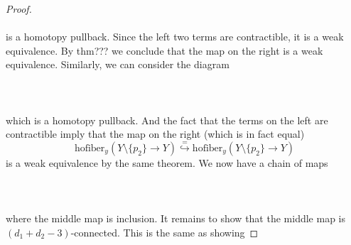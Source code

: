 \documentclass[a4paper]{article}
\begin{document}
\begin{lmm}{}{}
\begin{proof}
\\~\\
is a homotopy pullback. Since the left two terms are contractible, it is a weak equivalence. By thm??? we conclude that the map on the right is a weak equivalence. Similarly, we can consider the diagram \\~\\
\\~\\
which is a homotopy pullback. And the fact that the terms on the left are contractible imply that the map on the right (which is in fact equal) $$\text{hofiber}_y(Y\setminus\{p_2\}\to Y)\overset{=}{\hookrightarrow}\text{hofiber}_y(Y\setminus\{p_2\}\to Y)$$ is a weak equivalence by the same theorem. We now have a chain of maps \\~\\
\\~\\
where the middle map is inclusion. It remains to show that the middle map is $(d_1+d_2-3)$-connected. This is the same as showing 
\end{proof}
\end{lmm}
\end{document}
